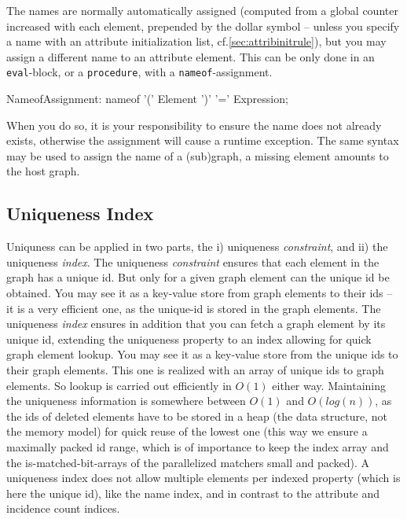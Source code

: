 The names are normally automatically assigned (computed from a global counter increased with each element, prepended by the dollar symbol -- unless you specify a name with an attribute initialization list, cf.\ref{sec:attribinitrule}), but you may assign a different name to an attribute element.
This can be only done in an \texttt{eval}-block, or a \texttt{procedure}, with a \texttt{nameof}-assignment.

\begin{rail}
  NameofAssignment:
    nameof '(' Element ')' '=' Expression;
\end{rail}

When you do so, it is your responsibility to ensure the name does not already exists, otherwise the assignment will cause a runtime exception.
The same syntax may be used to assign the name of a (sub)graph, a missing element amounts to the host graph.

\subsection{Uniqueness Index}\label{sec:uniqueness}
Uniquness can be applied in two parts, the i) uniqueness \emph{constraint}, and ii) the uniqueness \emph{index}.
The uniqueness \emph{constraint} ensures that each element in the graph has a unique id. 
But only for a given graph element can the unique id be obtained.
You may see it as a key-value store from graph elements to their ids -- it is a very efficient one, as the unique-id is stored in the graph elements. 
The uniqueness \emph{index} ensures in addition that you can fetch a graph element by its unique id, extending the uniqueness property to an index allowing for quick graph element lookup.
You may see it as a key-value store from the unique ids to their graph elements.
This one is realized with an array of unique ids to graph elements.
So lookup is carried out efficiently in $O(1)$ either way.
Maintaining the uniqueness information is somewhere between $O(1)$ and $O(log(n))$, as the ids of deleted elements have to be stored in a heap (the data structure, not the memory model) for quick reuse of the lowest one (this way we ensure a maximally packed id range, which is of importance to keep the index array and the is-matched-bit-arrays of the parallelized matchers small and packed).
A uniqueness index does not allow multiple elements per indexed property (which is here the unique id), like the name index, and in contrast to the attribute and incidence count indices.

